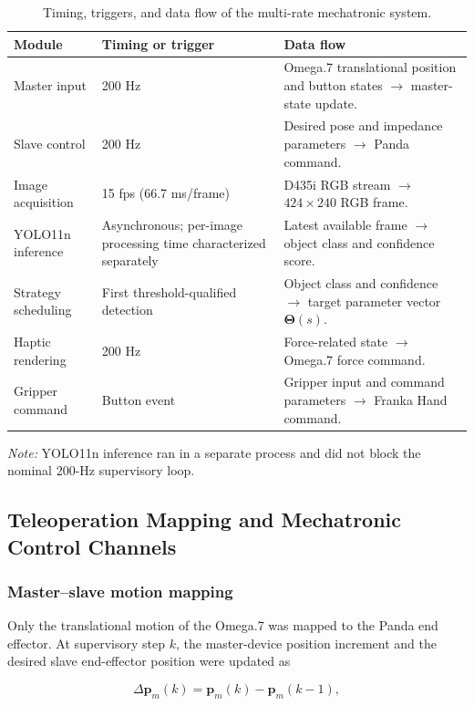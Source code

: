 \begin{table}[!t]
\centering
\caption{Timing, triggers, and data flow of the multi-rate mechatronic system.}
\label{tab:1}
\small
\setlength{\tabcolsep}{6pt}
\renewcommand{\arraystretch}{1.16}
\begin{tabularx}{\textwidth}{@{}p{}p{}Y@{}}
\toprule
Module & Timing or trigger & Data flow \\
\midrule
Master input & 200 Hz & Omega.7 translational position and button states $\rightarrow$ master-state update. \\
Slave control & 200 Hz & Desired pose and impedance parameters $\rightarrow$ Panda command. \\
Image acquisition & 15 fps (66.7 ms/frame) & D435i RGB stream $\rightarrow$ $424\times240$ RGB frame. \\
YOLO11n inference & Asynchronous; per-image processing time characterized separately & Latest available frame $\rightarrow$ object class and confidence score. \\
Strategy scheduling & First threshold-qualified detection & Object class and confidence $\rightarrow$ target parameter vector $\boldsymbol{\Theta}(s)$. \\
Haptic rendering & 200 Hz & Force-related state $\rightarrow$ Omega.7 force command. \\
Gripper command & Button event & Gripper input and command parameters $\rightarrow$ Franka Hand command. \\
\bottomrule
\end{tabularx}
\par\smallskip
\footnotesize\textit{Note:} YOLO11n inference ran in a separate process and did not block the nominal 200-Hz supervisory loop.
\end{table}

\subsection{Teleoperation Mapping and Mechatronic Control Channels}
\subsubsection{Master--slave motion mapping}
Only the translational motion of the Omega.7 was mapped to the Panda end effector. At supervisory step $k$, the master-device position increment and the desired slave end-effector position were updated as

\begin{equation}
\label{eq:master-position-increment}
\Delta\mathbf{p}_m(k)=\mathbf{p}_m(k)-\mathbf{p}_m(k-1),
\end{equation}

